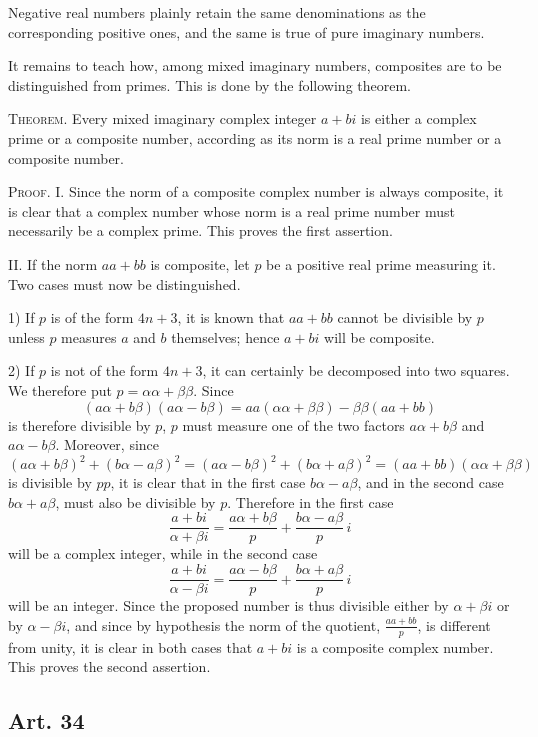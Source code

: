 \documentclass[12pt]{article}
\newcommand{\art}[1]{\subsection*{Art. #1}}
\begin{document}
Negative real numbers plainly retain the same denominations as the corresponding positive ones, and the same is true of pure imaginary numbers.

It remains to teach how, among mixed imaginary numbers, composites are to be distinguished from primes. This is done by the following theorem.

\medskip
\noindent\textsc{Theorem.} Every mixed imaginary complex integer $a+bi$ is either a complex prime or a composite number, according as its norm is a real prime number or a composite number.

\medskip
\noindent\textsc{Proof.} I. Since the norm of a composite complex number is always composite, it is clear that a complex number whose norm is a real prime number must necessarily be a complex prime. This proves the first assertion.

II. If the norm $aa+bb$ is composite, let $p$ be a positive real prime measuring it. Two cases must now be distinguished.

1) If $p$ is of the form $4n+3$, it is known that $aa+bb$ cannot be divisible by $p$ unless $p$ measures $a$ and $b$ themselves; hence $a+bi$ will be composite.

2) If $p$ is not of the form $4n+3$, it can certainly be decomposed into two squares. We therefore put $p=\alpha\alpha+\beta\beta$. Since
\[
(a\alpha+b\beta)(a\alpha-b\beta)=aa(\alpha\alpha+\beta\beta)-\beta\beta(aa+bb)
\]
is therefore divisible by $p$, $p$ must measure one of the two factors $a\alpha+b\beta$ and $a\alpha-b\beta$. Moreover, since
\[
(a\alpha+b\beta)^2+(b\alpha-a\beta)^2=(a\alpha-b\beta)^2+(b\alpha+a\beta)^2=(aa+bb)(\alpha\alpha+\beta\beta)
\]
is divisible by $pp$, it is clear that in the first case $b\alpha-a\beta$, and in the second case $b\alpha+a\beta$, must also be divisible by $p$. Therefore in the first case
\[
\frac{a+bi}{\alpha+\beta i}=\frac{a\alpha+b\beta}{p}+\frac{b\alpha-a\beta}{p}\,i
\]
will be a complex integer, while in the second case
\[
\frac{a+bi}{\alpha-\beta i}=\frac{a\alpha-b\beta}{p}+\frac{b\alpha+a\beta}{p}\,i
\]
will be an integer. Since the proposed number is thus divisible either by $\alpha+\beta i$ or by $\alpha-\beta i$, and since by hypothesis the norm of the quotient, $\frac{aa+bb}{p}$, is different from unity, it is clear in both cases that $a+bi$ is a composite complex number. This proves the second assertion.

\art{34}
\end{document}
